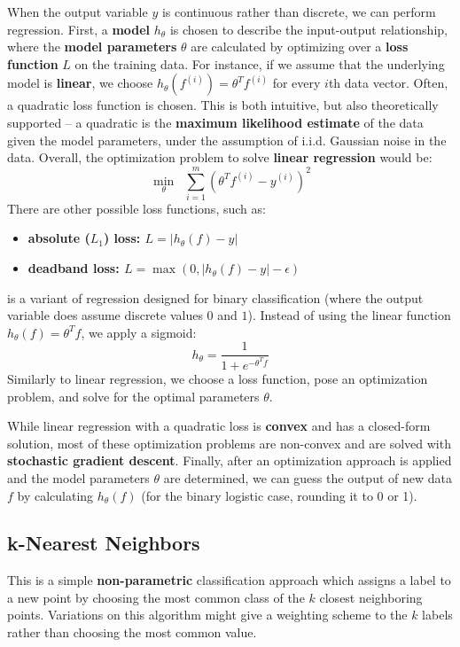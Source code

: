\documentclass[11pt]{article}
\begin{document}
When the output variable $y$ is continuous rather than discrete, we can perform regression. First, a {\bf{model}} $h_{\theta}$ is chosen to describe the input-output relationship, where the {\bf{model parameters}} $\theta$ are calculated by optimizing over a {\bf{loss function}} $L$ on the training data. For instance, if we assume that the underlying model is {\bf{linear}}, we choose $h_{\theta}(f^{(i)}) = \theta^T f^{(i)}$ for every $i$th data vector. Often, a quadratic loss function is chosen. This is both intuitive, but also theoretically supported -- a quadratic is the {\bf{maximum likelihood estimate}} of the data given the model parameters, under the assumption of i.i.d. Gaussian noise in the data. Overall, the optimization problem to solve {\bf{linear regression}} would be:
\[
\min_{\theta} \; \; \sum_{i = 1}^m (\theta^T f^{(i)} - y^{(i)})^2
\]
There are other possible loss functions, such as:
\begin{itemize}
    \item \bf{absolute ($L_1$) loss}: $L = |h_{\theta}(f) - y|$
    \item \bf{deadband loss}: $L = \max(0, |h_{\theta}(f) - y| - \epsilon)$
\end{itemize}

 is a variant of regression designed for binary classification (where the output variable does assume discrete values $0$ and $1$). Instead of using the linear function $h_{\theta}(f) = \theta^T f$, we apply a sigmoid:
\[
h_{\theta} = \frac{1}{1 + e^{-\theta^T f}}
\]
Similarly to linear regression, we choose a loss function, pose an optimization problem, and solve for the optimal parameters $\theta$. 

\noindent While linear regression with a quadratic loss is {\bf{convex}} and has a closed-form solution, most of these optimization problems are non-convex and are solved with {\bf{stochastic gradient descent}}. Finally, after an optimization approach is applied and the model parameters $\theta$ are determined, we can guess the output of new data $f$ by calculating $h_{\theta}(f)$ (for the binary logistic case, rounding it to 0 or 1).




\subsection*{k-Nearest Neighbors}
This is a simple {\bf{non-parametric}} classification approach which assigns a label to a new point by choosing the most common class of the $k$ closest neighboring points. Variations on this algorithm might give a weighting scheme to the $k$ labels rather than choosing the most common value. 
\end{document}
